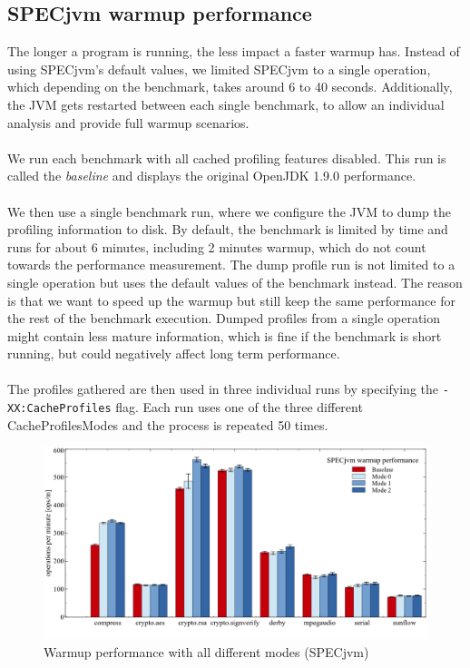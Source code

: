 \subsection{SPECjvm warmup performance}
\label{s:perf_specjvm_warmup}
The longer a program is running, the less impact a faster warmup has. 
Instead of using SPECjvm's default values, we limited SPECjvm to a single operation, which depending on the benchmark, takes around 6 to 40 seconds.
Additionally, the JVM gets restarted between each single benchmark, to allow an individual analysis and provide full warmup scenarios.
\\\\
We run each benchmark with all cached profiling features disabled. This run is called the \textit{baseline} and displays the original OpenJDK 1.9.0 performance.    
\\\\ 
We then use a single benchmark run, where we configure the JVM to dump the profiling information to disk. By default, the benchmark is limited by time and runs for about 6 minutes, including 2 minutes warmup, which do not count towards the performance measurement. The dump profile run is not limited to a single operation but uses the default values of the benchmark instead. The reason is that we want to speed up the warmup but still keep the same performance for the rest of the benchmark execution. Dumped profiles from a single operation might contain less mature information, which is fine if the benchmark is short running, but could negatively affect long term performance.
\\\\
The profiles gathered are then used in three individual runs by specifying the \texttt{-XX:CacheProfiles} flag. Each run uses one of the three different CacheProfilesModes and the process is repeated 50 times.
\begin{figure}[ht!]
  \begin{center}
    \centering
    \includegraphics[width=1.0\textwidth]{figures/others_warmup.png}
    \caption{Warmup performance with all different modes (SPECjvm)}
    \label{f:others_warmup}
  \end{center}
\end{figure}

